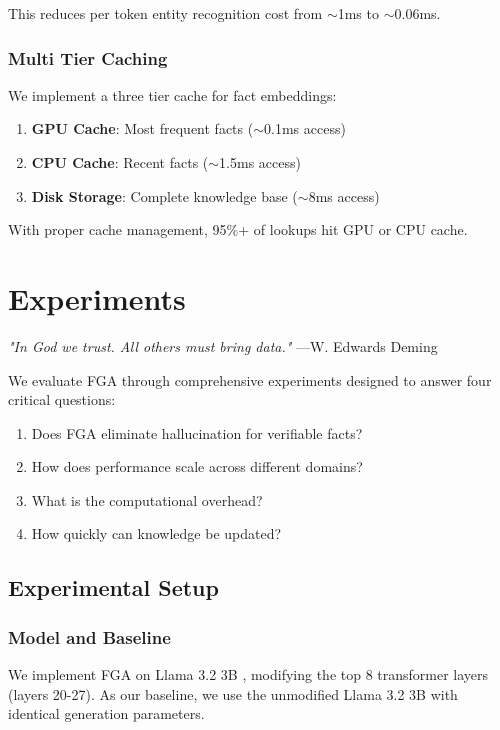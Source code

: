 \documentclass[11pt, a4paper]{article}
\theoremstyle{definition}
\begin{document}
This reduces per token entity recognition cost from $\sim$1ms to $\sim$0.06ms.

\subsubsection{Multi Tier Caching}

We implement a three tier cache for fact embeddings:
\begin{enumerate}
    \item \textbf{GPU Cache}: Most frequent facts ($\sim$0.1ms access)
    \item \textbf{CPU Cache}: Recent facts ($\sim$1.5ms access)  
    \item \textbf{Disk Storage}: Complete knowledge base ($\sim$8ms access)
\end{enumerate}

With proper cache management, 95\%+ of lookups hit GPU or CPU cache.

\section{Experiments}

\textit{"In God we trust. All others must bring data."} —W. Edwards Deming

We evaluate FGA through comprehensive experiments designed to answer four critical questions:
\begin{enumerate}
    \item Does FGA eliminate hallucination for verifiable facts?
    \item How does performance scale across different domains?
    \item What is the computational overhead?
    \item How quickly can knowledge be updated?
\end{enumerate}

\subsection{Experimental Setup}

\subsubsection{Model and Baseline}

We implement FGA on Llama 3.2 3B \cite{llama2023}, modifying the top 8 transformer layers (layers 20-27). As our baseline, we use the unmodified Llama 3.2 3B with identical generation parameters.
\end{document}
